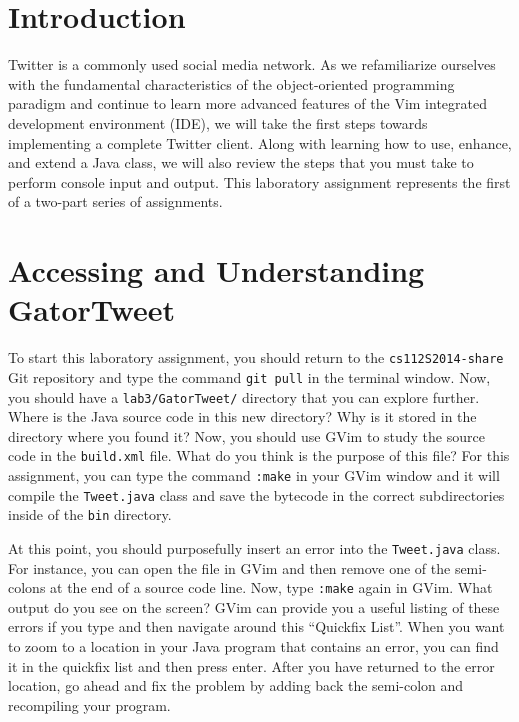 


\usepackage[compact]{titlesec}



\section*{Introduction}

Twitter is a commonly used social media network.  As we refamiliarize ourselves with the fundamental characteristics of the
object-oriented programming paradigm and continue to learn more advanced features of the Vim integrated development environment
(IDE), we will take the first steps towards implementing a complete Twitter client. Along with learning how to use, enhance, and
extend a Java class, we will also review the steps that you must take to perform console input and output. This laboratory
assignment represents the first of a two-part series of assignments. 

\section*{Accessing and Understanding GatorTweet}

To start this laboratory assignment, you should return to the {\tt cs112S2014-share} Git repository and type the command {\tt git
pull} in the terminal window.  Now, you should have a {\tt lab3/GatorTweet/} directory that you can explore further.  Where is
the Java source code in this new directory? Why is it stored in the directory where you found it? Now, you should use GVim to
study the source code in the {\tt build.xml} file.  What do you think is the purpose of this file? For this assignment, you can
type the command {\tt :make} in your GVim window and it will compile the {\tt Tweet.java} class and save the bytecode in the
correct subdirectories inside of the {\tt bin} directory. 

At this point, you should purposefully insert an error into the {\tt Tweet.java} class.  For instance, you can open the file in
GVim and then remove one of the semi-colons at the end of a source code line. Now, type {\tt :make} again in GVim.  What output do
you see on the screen? GVim can provide you a useful listing of these errors if you type {\tt <,q>} and then navigate around this
``Quickfix List''. When you want to zoom to a location in your Java program that contains an error, you can find it in the
quickfix list and then press enter.  After you have returned to the error location, go ahead and fix the problem by adding back
the semi-colon and recompiling your program. 

